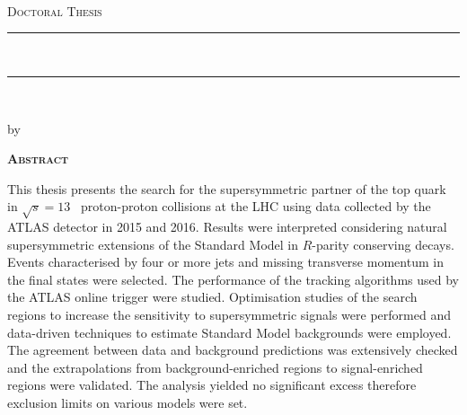 
\thispagestyle{empty}

\begin{center}

    {\normalsize \href{http://www.sussex.ac.uk/}{\myUni} \\} %
    {\normalsize \myFaculty \\} %
    {\normalsize \myDepartment \\} %
    \bigskip\vspace*{.02\textheight}
    {\Large \textsc{Doctoral Thesis}}\par
    \bigskip
    
    {\rule{\linewidth}{1pt}\\%
    \Large \myTitle \par} %
    \rule{\linewidth}{1pt}\\[0.4cm]
    
    \bigskip
	{\normalsize by \myName \par} %
    \bigskip\vspace*{.06\textheight}
\end{center}

    {\centering\Huge\textsc{\textbf{Abstract}} \par}
    \bigskip



    \noindent This thesis presents the search for the supersymmetric partner of the top quark in $\sqrt{s}=13$ \TeV\ proton-proton collisions at the LHC using data collected by the ATLAS detector in 2015 and 2016. Results were interpreted considering natural supersymmetric extensions of the Standard Model in $R$-parity conserving decays. Events characterised by four or more jets and missing transverse momentum in the final states were selected. The performance of the tracking algorithms used by the ATLAS online trigger were studied. Optimisation studies of the search regions to increase the sensitivity to supersymmetric signals were performed and data-driven techniques to estimate Standard Model backgrounds were employed. The agreement between data and background predictions was extensively checked and the extrapolations from background-enriched regions to signal-enriched regions were validated. The analysis yielded no significant excess therefore exclusion limits on various models were set.


